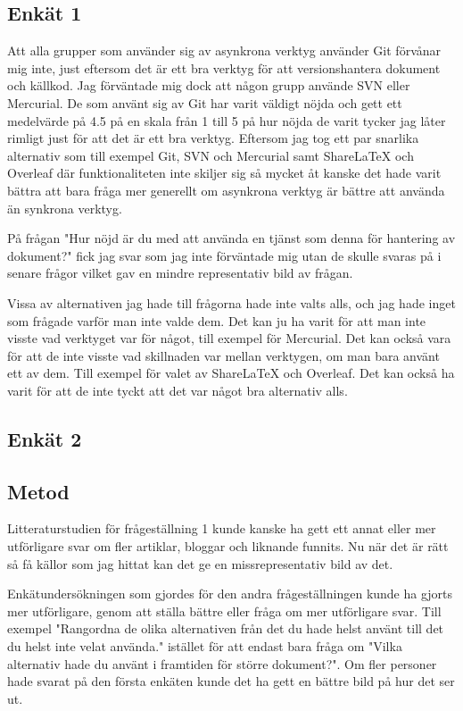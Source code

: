\subsection{Enkät 1}
Att alla grupper som använder sig av asynkrona verktyg använder Git förvånar mig inte, just eftersom det är ett bra verktyg för att versionshantera dokument och källkod. Jag förväntade mig dock att någon grupp använde SVN eller Mercurial. De som använt sig av Git har varit väldigt nöjda och gett ett medelvärde på 4.5 på en skala från 1 till 5 på hur nöjda de varit tycker jag låter rimligt just för att det är ett bra verktyg. Eftersom jag tog ett par snarlika alternativ som till exempel Git, SVN och Mercurial samt ShareLaTeX och Overleaf där funktionaliteten inte skiljer sig så mycket åt kanske det hade varit bättra att bara fråga mer generellt om asynkrona verktyg är bättre att använda än synkrona verktyg.

På frågan "Hur nöjd är du med att använda en tjänst som denna för hantering av dokument?" fick jag svar som jag inte förväntade mig utan de skulle svaras på i senare frågor vilket gav en mindre representativ bild av frågan.

Vissa av alternativen jag hade till frågorna hade inte valts alls, och jag hade inget som frågade varför man inte valde dem. Det kan ju ha varit för att man inte visste vad verktyget var för något, till exempel för Mercurial. Det kan också vara för att de inte visste vad skillnaden var mellan verktygen, om man bara använt ett av dem. Till exempel för valet av ShareLaTeX och Overleaf. Det kan också ha varit för att de inte tyckt att det var något bra alternativ alls. 


\subsection{Enkät 2}



\subsection{Metod}
Litteraturstudien för frågeställning 1 kunde kanske ha gett ett annat eller mer utförligare svar om fler artiklar, bloggar och liknande funnits. Nu när det är rätt så få källor som jag hittat kan det ge en missrepresentativ bild av det.

Enkätundersökningen som gjordes för den andra frågeställningen kunde ha gjorts mer utförligare, genom att ställa bättre eller fråga om mer utförligare svar. Till exempel "Rangordna de olika alternativen från det du hade helst använt till det du helst inte velat använda." istället för att endast bara fråga om "Vilka alternativ hade du använt i framtiden för större dokument?". Om fler personer hade svarat på den första enkäten kunde det ha gett en bättre bild på hur det ser ut.


